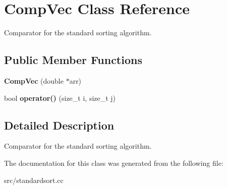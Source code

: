 \hypertarget{classCompVec}{
\section{CompVec Class Reference}
\label{d7/d1f/classCompVec}
}


Comparator for the standard sorting algorithm.  
\subsection*{Public Member Functions}
\begin{DoxyCompactItemize}
\item 
\hypertarget{classCompVec_a6963b86bb7b027c564f9fcbfa48631ff}{
{\bfseries CompVec} (double $\ast$arr)}
\label{d7/d1f/classCompVec_a6963b86bb7b027c564f9fcbfa48631ff}

\item 
\hypertarget{classCompVec_af72aba58e4ec029df30580c71c965490}{
bool {\bfseries operator()} (size\_\-t i, size\_\-t j)}
\label{d7/d1f/classCompVec_af72aba58e4ec029df30580c71c965490}

\end{DoxyCompactItemize}


\subsection{Detailed Description}
Comparator for the standard sorting algorithm. 

The documentation for this class was generated from the following file:\begin{DoxyCompactItemize}
\item 
src/standardsort.cc\end{DoxyCompactItemize}

